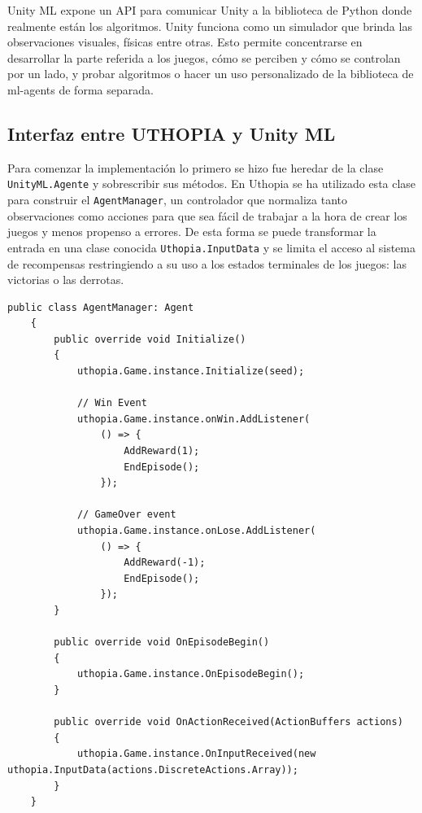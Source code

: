 Unity ML expone un API para comunicar Unity a la biblioteca de Python donde realmente están los algoritmos. Unity funciona como un simulador que brinda las observaciones visuales, físicas entre otras. Esto permite concentrarse en desarrollar la parte referida a los juegos, cómo se perciben y cómo se controlan por un lado, y probar algoritmos o hacer un uso personalizado de la biblioteca de ml-agents de forma separada.
 
\subsection{Interfaz entre UTHOPIA y Unity ML}
 
Para comenzar la implementación lo primero se hizo fue heredar de la clase \lstinline{UnityML.Agente} y sobrescribir sus métodos. En Uthopia se ha utilizado esta clase para construir el \lstinline{AgentManager}, un controlador que normaliza tanto observaciones como acciones para que sea fácil de trabajar a la hora de crear los juegos y menos propenso a errores. De esta forma se puede transformar la entrada en una clase conocida \lstinline{Uthopia.InputData} y se limita el acceso al sistema de recompensas restringiendo a su uso a los estados terminales de los juegos: las victorias o las derrotas. 
 
\begin{lstlisting}[caption={Implementación de la clase \lstinline{AgentManager} la cual conecta a los agentes de Unity ML Toolkit con los juegos de UTHOPIA}]
    public class AgentManager: Agent
    {
        public override void Initialize()
        {
            uthopia.Game.instance.Initialize(seed);
 
            // Win Event
            uthopia.Game.instance.onWin.AddListener(
                () => { 
                    AddReward(1); 
                    EndEpisode();
                });
 
            // GameOver event
            uthopia.Game.instance.onLose.AddListener(
                () => { 
                    AddReward(-1); 
                    EndEpisode(); 
                });
        }
 
        public override void OnEpisodeBegin()
        {
            uthopia.Game.instance.OnEpisodeBegin();
        }
 
        public override void OnActionReceived(ActionBuffers actions)
        {
            uthopia.Game.instance.OnInputReceived(new uthopia.InputData(actions.DiscreteActions.Array));
        }
    }
\end{lstlisting}

